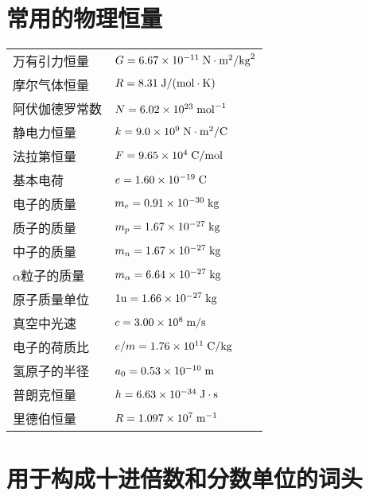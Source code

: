 \chapter{常用的物理恒量}
\begin{center}
    \begin{tabular}{ll}
        万有引力恒量&    $G=6.67\times10^{-11}\; {\rm N}\cdot {\rm m^2}/{\rm kg}^2$\\
        摩尔气体恒量&    $R=8.31\;  {\rm J}/({\rm mol}\cdot {\rm K})$\\
        阿伏伽德罗常数&    $N=6.02\times 10^{23}\; {\rm mol}^{-1}$\\
        静电力恒量&    $k=9.0\times10^9\;  {\rm N}\cdot {\rm m^2}/{\rm C}$\\
        法拉第恒量&    $F=9.65\times10^4\;  {\rm C}/{\rm mol}$\\
        基本电荷&    $e=1.60\times10^{-19}\;  {\rm C}$\\
        电子的质量&    $m_e=0.91\times10^{-30}\; {\rm kg}$\\
        质子的质量&    $m_p=1.67\times10^{-27}\;   {\rm kg}$\\
        中子的质量&    $m_n=1.67\times10^{-27} \;   {\rm kg}$\\
        $\alpha$粒子的质量&    $m_{\alpha}=6.64\times10^{-27} \;  {\rm kg}$\\
        原子质量单位&    $1{\rm u}=1.66\times10^{-27} \;   {\rm kg}$\\
        真空中光速&    $c=3.00\times10^8\; \text{m}/\text{s}$\\
        电子的荷质比&    $e/m=1.76\times10^{11}\; {\rm C}/{\rm kg}$ \\
        氢原子的半径&    $a_0=0.53\times10^{-10}\; {\rm m}$   \\
        普朗克恒量&    $h=6.63\times10^{-34}\;  {\rm J}\cdot {\rm s}$   \\
        里德伯恒量&    $R=1.097\times10^7\;  {\rm m}^{-1}$\\        
    \end{tabular}
\end{center}

\chapter{用于构成十进倍数和分数单位的词头}

